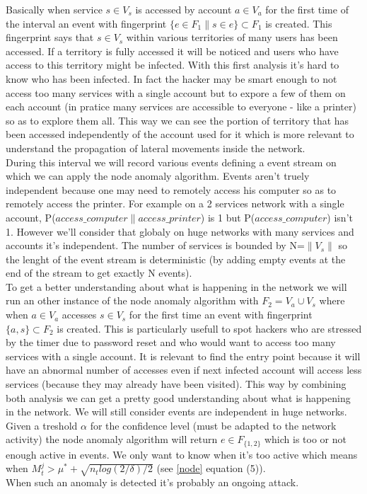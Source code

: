 \documentclass[11pt]{article}
\begin{document}
Basically when service $s\in V_s$ is accessed by account $a\in V_a$ for the first time of the interval an event with fingerprint $\{e\in F_1 \| s \in e\}\subset F_1$ is created. This fingerprint says that $s\in V_s$ within various territories of many users has been accessed. If a territory is fully accessed it will be noticed and users who have access to this territory might be infected. With this first analysis it's hard to know who has been infected. In fact the hacker may be smart enough to not access too many services with a single account but to expore a few of them on each account (in pratice many services are accessible to everyone - like a printer) so as to explore them all. This way we can see the portion of territory that has been accessed independently of the account used for it which is more relevant to understand the propagation of lateral movements inside the network.\\
\indent During this interval we will record various events defining a event stream on which we can apply the node anomaly algorithm. Events aren't truely independent because one may need to remotely access his computer so as to remotely access the printer. For example on a 2 services network with a single account, P($access\_computer\|access\_printer$) is 1 but P($access\_computer$) isn't 1. However we'll consider that globaly on huge networks with many services and accounts it's independent. The number of services is bounded by N=$\|V_s\|$ so the lenght of the event stream is deterministic (by adding empty events at the end of the stream to get exactly N events).\\
\indent To get a better understanding about what is happening in the network we will run an other instance of the node anomaly algorithm with $F_2 = V_a \cup V_s$ where when $a\in V_a$ accesses $s\in V_s$ for the first time an event with fingerprint $\{a,s\} \subset F_2$ is created. This is particularly usefull to spot hackers who are stressed by the timer due to password reset and who would want to access too many services with a single account. It is relevant to find the entry point because it will have an abnormal number of accesses even if next infected account will access less services (because they may already have been visited). This way by combining both analysis we can get a pretty good understanding about what is happening in the network. We will still consider events are independent in huge networks.\\
\indent Given a treshold $\alpha$ for the confidence level (must be adapted to the network activity) the node anomaly algorithm will return $e\in F_{\{1,2\}}$ which is too or not enough active in events. We only want to know when it's too active which means when $M_t^{j} > \mu^*+\sqrt{n_tlog(2/\delta)/2}$ (see \ref{node} equation (5)). \\
\indent When such an anomaly is detected it's probably an ongoing attack. 
\end{document}

